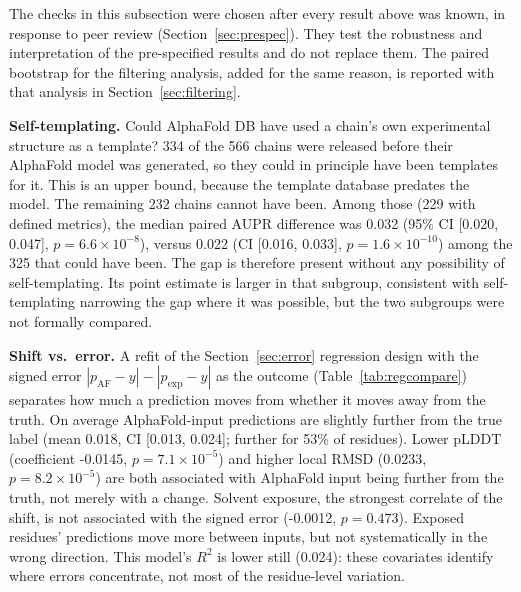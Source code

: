 \documentclass[10pt]{article}
\begin{document}
The checks in this subsection were chosen after every result above was known,
in response to peer review (Section~\ref{sec:prespec}). They test the
robustness and interpretation of the pre-specified results and do not
replace them. The paired bootstrap for the filtering analysis, added for the
same reason, is reported with that analysis in Section~\ref{sec:filtering}.

\textbf{Self-templating.} Could AlphaFold DB have used a chain's own
experimental structure as a template? 334 of the 566
chains were released before their AlphaFold model was generated, so they
could in principle have been templates for it. This is an upper bound,
because the template database predates the model. The remaining
232 chains cannot have been. Among those (229 with
defined metrics), the median paired AUPR difference was 0.032
(95\% CI [0.020, 0.047], $p = 6.6\times10^{-8}$), versus 0.022
(CI [0.016, 0.033], $p = 1.6\times10^{-10}$) among the 325 that could have been. The
gap is therefore present without any possibility of self-templating. Its
point estimate is larger in that subgroup, consistent with self-templating
narrowing the gap where it was possible, but the two subgroups were not
formally compared.

\textbf{Shift vs.\ error.} A refit of the Section~\ref{sec:error}
regression design with the signed error
$|p_{\mathrm{AF}} - y| - |p_{\mathrm{exp}} - y|$ as the outcome
(Table~\ref{tab:regcompare}) separates how much a prediction moves from
whether it moves away from the truth. On average AlphaFold-input
predictions are slightly further from the true label (mean
0.018, CI [0.013, 0.024]; further for 53\% of
residues). Lower pLDDT (coefficient -0.0145, $p = 7.1\times10^{-5}$)
and higher local RMSD (0.0233, $p = 8.2\times10^{-5}$) are both
associated with AlphaFold input being further from the truth, not merely
with a change. Solvent exposure, the strongest correlate of the shift, is not
associated with the signed error (-0.0012, $p = 0.473$).
Exposed residues' predictions move more between inputs, but not
systematically in the wrong direction. This model's $R^2$ is lower still
(0.024): these covariates identify where errors concentrate, not most of
the residue-level variation.
\end{document}
